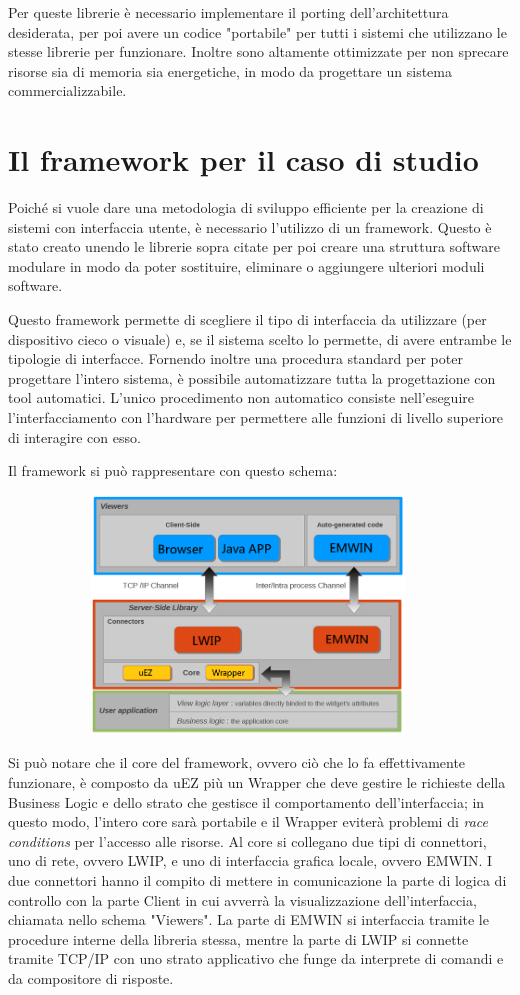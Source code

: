 \documentclass[journal]{IEEEtran}
\begin{document}
Per queste librerie è necessario implementare il porting dell'architettura desiderata, per poi avere un codice "portabile" per tutti i sistemi che utilizzano le stesse librerie per funzionare. Inoltre sono altamente ottimizzate per non sprecare risorse sia di memoria sia energetiche, in modo da progettare un sistema commercializzabile.



\section{Il framework per il caso di studio}
Poiché si vuole dare una metodologia di sviluppo efficiente per la creazione di sistemi con interfaccia utente, è necessario l'utilizzo di un framework. Questo è stato creato unendo le librerie sopra citate per poi creare una struttura software modulare in modo da poter sostituire, eliminare o aggiungere ulteriori moduli software. 

Questo framework permette di scegliere il tipo di interfaccia da utilizzare (per dispositivo cieco o visuale) e, se il sistema scelto lo permette, di avere entrambe le tipologie di interfacce. Fornendo inoltre una procedura standard per poter progettare l'intero sistema, è possibile automatizzare tutta la progettazione con tool automatici. L'unico procedimento non automatico consiste nell'eseguire l'interfacciamento con l'hardware per permettere alle funzioni di livello superiore di interagire con esso.

Il framework si può rappresentare con questo schema:

\includegraphics[width=5in,height=2.5in,clip,keepaspectratio]{framework.png}

Si può notare che il core del framework, ovvero ciò che lo fa effettivamente funzionare, è composto da uEZ più un Wrapper che deve gestire le richieste della Business Logic e dello strato che gestisce il comportamento dell'interfaccia; in questo modo, l'intero core sarà portabile e il Wrapper eviterà problemi di \textit{race conditions} per l'accesso alle risorse. 
Al core si collegano due tipi di connettori, uno di rete, ovvero LWIP, e uno di interfaccia grafica locale, ovvero EMWIN. I due connettori hanno il compito di mettere in comunicazione la parte di logica di controllo con la parte Client in cui avverrà la visualizzazione dell'interfaccia, chiamata nello schema "Viewers". La parte di EMWIN si interfaccia tramite le procedure interne della libreria stessa, mentre la parte di LWIP si connette tramite TCP/IP con uno strato applicativo che funge da interprete di comandi e da compositore di risposte.
\end{document}
